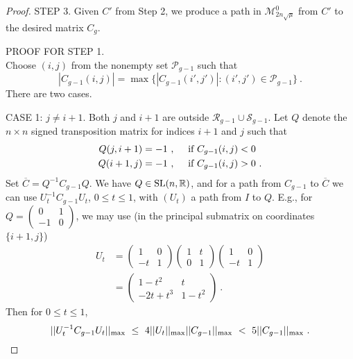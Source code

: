\documentclass{amsart}
\theoremstyle{definition}
\theoremstyle{remark}
\numberwithin{equation}{section}
\begin{document}
{{\begin{proof}
 

STEP 3. Given $C'$ from Step 2, we produce a path in 
$\mathcal M^0_{2n\sqrt{\mu}}$ from $C'$ to the desired matrix $C_g$. 

PROOF  FOR STEP 1. 
\\ 
Choose $(i,j)$ from the nonempty set
$\mathcal P_{g-1}$ such that  
\[|C_{g-1}(i,j)|= \max \{|C_{g-1}(i',j')|: (i',j')\in \mathcal P_{g-1}\}\ .
\]     
There are two cases. 

CASE 1: $j\neq i+1$.  Both $j$ and $i+1$ are outside 
 $\mathcal R_{g-1} \cup \mathcal S_{g-1}$. 
Let $Q$ denote the $n\times n$ signed transposition 
matrix for indices 
$i+1$ and $j$ such that 
\begin{align*} 
Q(j,i+1) &  = -1 \ , \quad 
\textnormal{ if } C_{g-1}(i,j) < 0 \\ 
Q(i+1,j) &  = -1 \ , \quad 
\textnormal{ if } C_{g-1}(i,j) > 0 \ . 
\end{align*} 
Set $\overline C=Q^{-1}C_{g-1}Q$. 
We have $Q\in \textnormal{SL}(n,\mathbb R)$, and for a path 
from $C_{g-1}$ to $\overline C$ we can use 
$U_t^{-1}C_{g-1}U_t$, $0\leq t\leq 1$, with $(U_t)$ a path 
from $I$ to $Q$. 
E.g., for $Q=
\begin{pmatrix} 
0 & 1 \\ -1 & 0 
\end{pmatrix}$, we may use (in the principal submatrix on 
coordinates $\{i+1,j\}$) 
\begin{align*} 
U_t &= 
\begin{pmatrix} 
1 & 0 
\\ 
-t & 1
\end{pmatrix}
\begin{pmatrix} 
1 & t 
\\ 
0 & 1
\end{pmatrix}
\begin{pmatrix} 
1 & 0 
\\ 
-t & 1
\end{pmatrix} \\
&= 
\begin{pmatrix} 
1-t^2 & t 
\\ 
-2t +t^3 & 1-t^2
\end{pmatrix} \ . 
\end{align*} 
Then for $0\leq t\leq 1$, 
\[
||U_t^{-1}C_{g-1}U_t||_{\textnormal{max}} \ 
\leq \ 
4
||U_t||_{\textnormal{max}} 
||C_{g-1}||_{\textnormal{max}} \ 
 < \ 
5 ||C_{g-1}||_{\textnormal{max}} 
\ . 
\] 


\end{proof}}}
\end{document}
